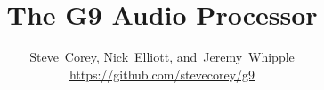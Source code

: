 \documentclass[journal]{IEEEtran}
\begin{document}
	\title{The G9 Audio Processor}
	
	\author{Steve~Corey,
		Nick~Elliott,
		and~Jeremy~Whipple%
		\\
		\url{https://github.com/stevecorey/g9}
		
	}
	
	
	
\end{document}
